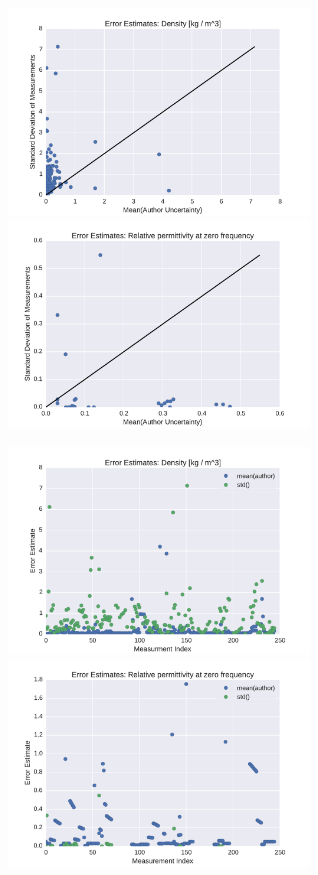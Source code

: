 \documentclass[aps,pre,twocolumn,nofootinbib,superscriptaddress,linenumbers]{revtex4-1}
\begin{document}
\begin{figure}

\includegraphics[width=8cm]{./figures/error_analysis_density.pdf}
\includegraphics[width=8cm]{./figures/error_analysis_dielectric.pdf}

\includegraphics[width=8cm]{./figures/error_analysis_density_index.pdf}
\includegraphics[width=8cm]{./figures/error_analysis_dielectric_index.pdf}


\end{figure}
\end{document}
